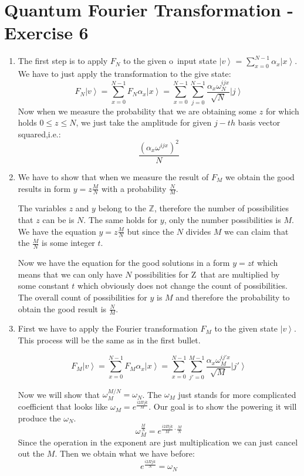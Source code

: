 \documentclass[a4paper,10pt]{article}
\newcommand{\ket}[1]{\ensuremath{\left|#1\right\rangle}} %
\begin{document}
\section*{Quantum Fourier Transformation - Exercise 6}
\begin{enumerate}[1]
\item 
The first step is to apply $F_N$ to the given o~input state \ket{v} = $\sum_{x=0}^{N-1} \alpha_x\ket{x}$.
We have to just apply the transformation to the give state:
$$
F_N\ket{v} = \sum_{x=0}^{N-1} F_N \alpha_x \ket{x} = \sum_{x=0}^{N-1} \sum_{j=0}^{N-1} \frac{\alpha_x \omega_N^{ijx}}{\sqrt{N}} \ket{j}
$$
Now when we measure the probability that we are obtaining some $z$ for which holds $0 \leq z \leq N$, we just take the amplitude for given $j-th$ basis vector squared,i.e.:
$$
\frac{\left(\alpha_x \omega^{ijx}\right)^2}{N}
$$

\item
We have to show that when we measure the result of $F_M$ we obtain the good results in form $y = z \frac{M}{N}$ with a probability $\frac{N}{M}$.

The variables $z$ and $y$ belong to the $\mathds{Z}$, therefore the number of possibilities that  $z$ can be is $N$. The same holds for $y$, only the number possibilities is $M$. We have the equation $y=z \frac{M}{N}$ but since the $N$ divides $M$ we can claim that the $\frac{M}{N}$ is some integer $t$.

Now we have the equation for the good solutions in a form $y = zt$ which means that we can only have $N$ possibilities for Z~that are multiplied by some constant $t$ which obviously does not change the count of possibilities. The overall count of possibilities for $y$ is $M$ and therefore the probability to obtain the good result is $\frac{N}{M}$.

\item 
First we have to apply the Fourier transformation $F_M$ to the given state \ket{v}. This process will be the same as in the first bullet.

$$
F_M\ket{v} = \sum_{x=0}^{N-1} F_M \alpha_x \ket{x} = \sum_{x=0}^{N-1} \sum_{j'=0}^{M-1} \frac{\alpha_x \omega_M^{ij'x}}{\sqrt{M}} \ket{j'}
$$

Now we will show that $\omega_M^{M/N} = \omega_N$. The $\omega_M$ just stands for more complicated coefficient that looks like $\omega_M = e^{\frac{i2\Pi jk}{M}}$. Our goal is to show the powering it will produce the $\omega_N$.
$$
\omega_M^{\frac{M}{N}} = e^{\frac{i2\Pi jk}{M}\cdot\frac{M}{N}}
$$
Since the operation in the exponent are just multiplication we can just cancel out the $M$. Then we obtain what we have before:
$$
e^{\frac{i2\Pi jk}{N}} = \omega_N
$$


\end{enumerate}
\end{document}
